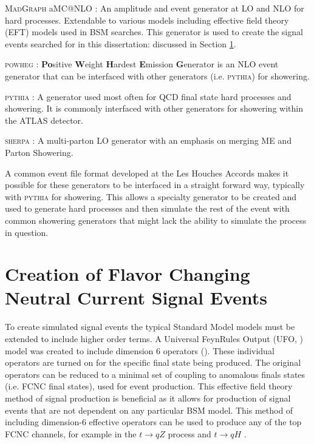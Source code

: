 \textsc{MadGraph} aMC@NLO \cite{MadGraph}: An amplitude and event generator at LO and NLO for hard processes.  Extendable to various models including effective field theory (EFT) models used in BSM searches.  This generator is used to create the signal events searched for in this dissertation: discussed in Section \ref{Sec:MG5Sig}. 

\textsc{powheg} \cite{Powheg1,Powheg2}: \textbf{Po}sitive \textbf{W}eight \textbf{H}ardest \textbf{E}mission \textbf{G}enerator is an NLO event generator that can be interfaced with other generators (i.e. \textsc{pythia}) for showering.

\textsc{pythia} \cite{Pythia8}: A generator used most often for QCD final state hard processes and showering.  It is commonly interfaced with other generators for showering within the ATLAS detector.

\textsc{sherpa} \cite{Sherpa11,Sherpa22}: A multi-parton LO generator with an emphasis on merging ME and Parton Showering.

A common event file format developed at the Les Houches Accords \cite{Alwall:2006yp} makes it possible for these generators to be interfaced in a straight forward way, typically with \textsc{pythia} for showering.  This allows a specialty generator to be created and used to generate hard processes and then simulate the rest of the event with common showering generators that might lack the ability to simulate the process in question.



\section{Creation of Flavor Changing Neutral Current Signal Events}
\label{Sec:MG5Sig}
To create simulated signal events the typical Standard Model models must be extended to include higher order terms.  A Universal FeynRules Output (UFO, \cite{UFO})   model was created to include dimension 6 operators (\cite{Dim6TermsOld, Dim6Terms}).  These individual operators are turned on for the specific final state being produced.  The original operators can be reduced to a minimal set of coupling to anomalous finals states (i.e. FCNC final states)\cite{TopCouplingsAguilarSaavedra}, used for event production.  This effective field theory method of signal production is beneficial as it allows for production of signal events that are not dependent on any particular BSM model.  This method of including dimension-6 effective operators can be used to produce any of the top FCNC channels, for example in the $t\rightarrow qZ$ process \cite{FCNCtqZ} and $t\rightarrow qH$ \cite{UFOModel}.

